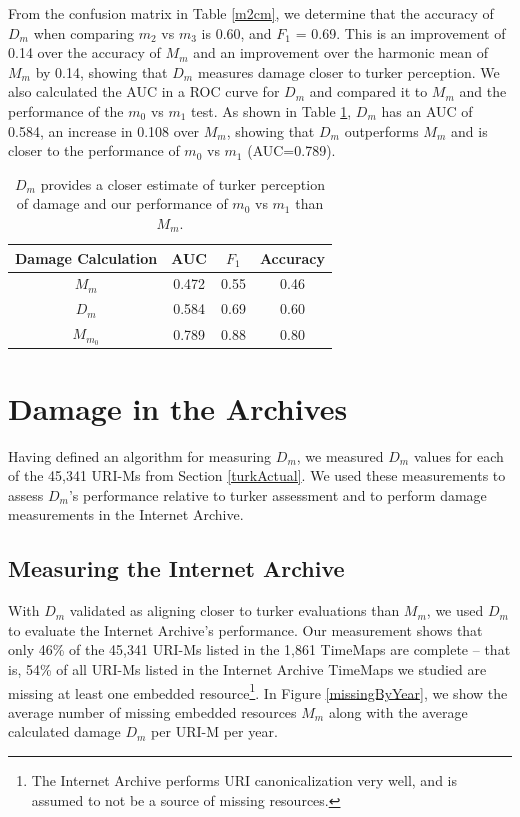 

From the confusion matrix in Table \ref{m2cm}, we determine that the accuracy of $D_m$ when comparing $m_2$ vs $m_3$ is 0.60, and $F_1$ = 0.69. This is an improvement of 0.14 over the accuracy of $M_m$ and an improvement over the harmonic mean of $M_m$ by 0.14, showing that $D_m$ measures damage closer to turker perception. 
We also calculated the AUC in a ROC curve for $D_m$ and compared it to $M_m$ and the performance of the $m_0$ vs $m_1$ test. As shown in Table \ref{auc2}, $D_m$ has an AUC of 0.584, an increase in 0.108 over $M_m$, showing that $D_m$ outperforms $M_m$ and is closer to the performance of $m_0$ vs $m_1$ (AUC=0.789).


\begin{table}
\centering
\begin{tabular}{ c | c | c | c }
    Damage Calculation &  AUC & $F_1$ & Accuracy\\
\hline
  $M_m$ & 0.472 & 0.55 & 0.46 \\
  $D_m$ & 0.584 & 0.69 & 0.60 \\
  $M_{m_0}$ & 0.789 & 0.88  & 0.80 \\
\hline
\end{tabular}
  \caption{$D_m$ provides a closer estimate of turker perception of damage and our performance of $m_0$ vs $m_1$ than $M_m$.}
  \label{auc2}
\end{table}

\section{Damage in the Archives}
\label{eval} 

Having defined an algorithm for measuring $D_m$, we measured $D_m$ values for each of the 45,341 URI-Ms from Section \ref{turkActual}. We used these measurements to assess $D_m$'s performance relative to turker assessment and to perform damage measurements in the Internet Archive.


\subsection{Measuring the Internet Archive}
\label{missing}

With $D_m$ validated as aligning closer to turker evaluations than $M_m$, we used $D_m$ to evaluate the Internet Archive's performance. Our measurement shows that only 46\% of the 45,341 URI-Ms listed in the 1,861 TimeMaps are complete -- that is, 54\% of all URI-Ms listed in the Internet Archive TimeMaps we studied are missing at least one embedded resource\footnote{The Internet Archive performs URI canonicalization very well, and is assumed to not be a source of missing resources.}. In Figure \ref{missingByYear}, we show the average number of missing embedded resources $M_m$ along with the average calculated damage $D_m$ per URI-M per year.

